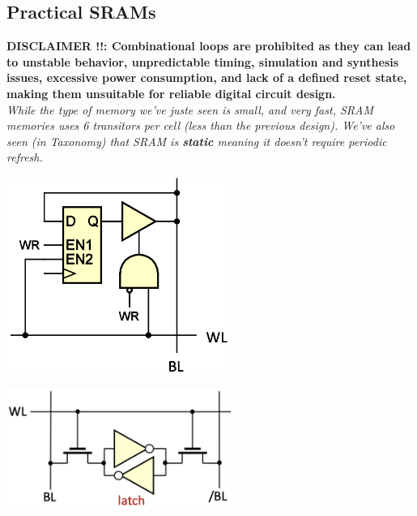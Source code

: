\subsection{Practical SRAMs}
\textbf{DISCLAIMER !!: Combinational loops are prohibited as they can lead to unstable behavior, unpredictable timing, simulation and synthesis issues, excessive power consumption, and lack of a defined reset state, making them unsuitable for reliable digital circuit design.} \\ \vspace*{5px}
\textit{While the type of memory we've juste seen is small, and very fast, SRAM memories uses 6 transitors per cell (less than the previous design). We've also seen (in Taxonomy) that SRAM is \textbf{static} meaning it doesn't require periodic refresh.} \\ \vspace*{5px}
\begin{minipage}[htp]{0.45\textwidth} 
    \begin{center}
        \includegraphics[width=0.55\textwidth]{chapters/chapter1c/images/ram.png}
    \end{center}
    \end{minipage}
    \hfill
    \vline
    \hfill
    \begin{minipage}[htp]{0.45\textwidth}
    \begin{center}
        \includegraphics[width=0.55\textwidth]{chapters/chapter1c/images/sram.png}
    \end{center}
    \end{minipage}

